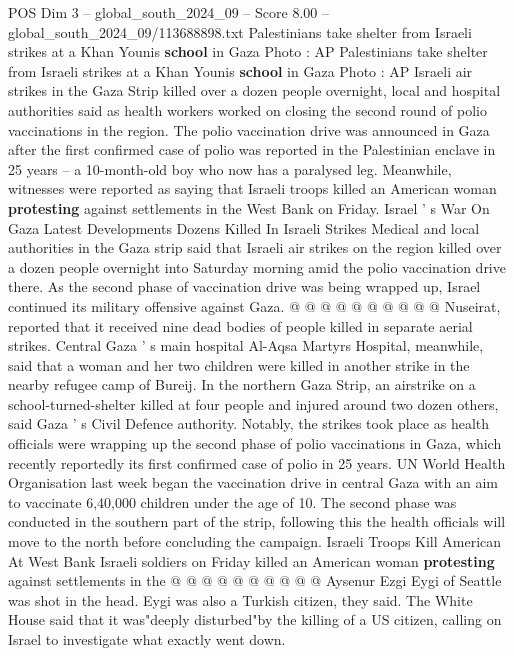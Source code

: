 \begin{textsample}{POS Dim 3 – global\_south\_2024\_09 – Score 8.00 – global\_south\_2024\_09/113688898.txt}  \label{ex:f3_pos_334}
Palestinians take shelter from Israeli strikes at a Khan Younis \textbf{school} in Gaza Photo : AP Palestinians take shelter from Israeli strikes at a Khan Younis \textbf{school} in Gaza Photo : AP Israeli air strikes in the Gaza Strip killed over a dozen people overnight, local and hospital authorities said as health workers worked on closing the second round of polio vaccinations in the region.
The polio vaccination drive was announced in Gaza after the first confirmed case of polio was reported in the Palestinian enclave in 25 years -- a 10-month-old boy who now has a paralysed leg.
Meanwhile, witnesses were reported as saying that Israeli troops killed an American woman \textbf{protesting} against settlements in the West Bank on Friday.
Israel ' s War On Gaza Latest Developments Dozens Killed In Israeli Strikes Medical and local authorities in the Gaza strip said that Israeli air strikes on the region killed over a dozen people overnight into Saturday morning amid the polio vaccination drive there.
As the second phase of vaccination drive was being wrapped up, Israel continued its military offensive against Gaza. @ @ @ @ @ @ @ @ @ @ Nuseirat, reported that it received nine dead bodies of people killed in separate aerial strikes.
Central Gaza ' s main hospital Al-Aqsa Martyrs Hospital, meanwhile, said that a woman and her two children were killed in another strike in the nearby refugee camp of Bureij.
In the northern Gaza Strip, an airstrike on a school-turned-shelter killed at four people and injured around two dozen others, said Gaza ' s Civil Defence authority.
Notably, the strikes took place as health officials were wrapping up the second phase of polio vaccinations in Gaza, which recently reportedly its first confirmed case of polio in 25 years.
UN World Health Organisation last week began the vaccination drive in central Gaza with an aim to vaccinate 6,40,000 children under the age of 10.
The second phase was conducted in the southern part of the strip, following this the health officials will move to the north before concluding the campaign.
Israeli Troops Kill American At West Bank Israeli soldiers on Friday killed an American woman \textbf{protesting} against settlements in the @ @ @ @ @ @ @ @ @ @ Aysenur Ezgi Eygi of Seattle was shot in the head.
Eygi was also a Turkish citizen, they said.
The White House said that it was"deeply disturbed"by the killing of a US citizen, calling on Israel to investigate what exactly went down.

\end{textsample}
